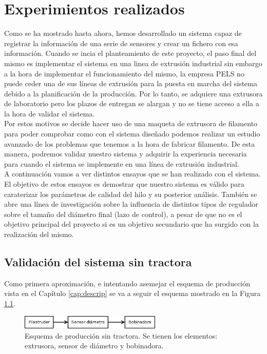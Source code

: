 \chapter{Experimientos realizados}
\label{cap:resultados}

Como se ha mostrado hasta ahora, hemos desarrollado un sistema capaz de registrar la información de una serie de sensores y crear un fichero con esa información. Cuando se incia el planteamiento de este proyecto, el paso final del mismo es implementar el sistema en una linea de extrusión industrial sin embargo a la hora de implementar el funcionamiento del mismo, la empresa PELS no puede ceder una de sus líneas de extrusión para la puesta en marcha del sistema debido a la planificación de la producción. Por lo tanto, se adquiere una extrusora de laboratorio pero los plazos de entregan se alargan y no se tiene acceso a ella a la hora de validar el sistema.\\

Por estos motivos se decide hacer uso de una maqueta de extrusora de filamento para poder comprobar como con el sistema diseñado podemos realizar un estudio avanzado de los problemas que tenemos a la hora de fabricar filamento. De esta manera, podremos validar nuestro sistema y adquirir la experiencia necesaria para cuando el sistema se implemente en una línea de extrusión industrial. \\

A continuación vamos a ver distintos ensayos que se han realizado con el sistema. El objetivo de estos ensayos es demostrar que nuestro sistema es válido para caraterizar los parámetros de calidad del hilo y su posterior análisis. También se abre una línea de investigación sobre la influencia de distintos tipos de regulador sobre el tamaño del diámetro final (lazo de control), a pesar de que no es el objetivo principal del proyecto si es un objetivo secundario que ha surgido con la realización del mismo.

\section{Validación del sistema sin tractora}
\label{sec:FSB}

Como primera aproximación, e intentando asemejar el esquema de producción vista en el Capítulo \ref{cap:descrip} se va a seguir el esquema mostrado en la Figura \ref{fig:esquemap_FSB}.

\begin{figure}[H]
    \centering
    \includegraphics[width=0.6\textwidth]{images/producciones/Diagram1.png}
    \caption[Esquema de producción sin tractora.]{Esquema de producción sin tractora. Se tienen los elementos: extrusora, sensor de diámetro y bobinadora.}
    \label{fig:esquemap_FSB}
\end{figure}

